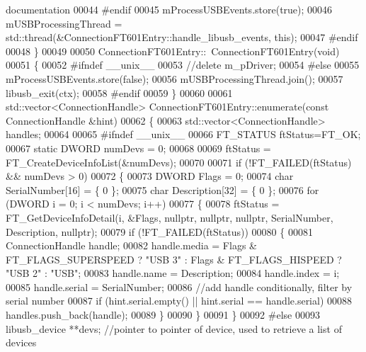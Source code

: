 \begin{DoxyCode}
{{{       documentation}
00044 \textcolor{preprocessor}{#endif}
00045     mProcessUSBEvents.store(\textcolor{keyword}{true});
00046     mUSBProcessingThread = std::thread(&ConnectionFT601Entry::handle\_libusb\_events, \textcolor{keyword}{this});
00047 \textcolor{preprocessor}{#endif}
00048 \}
00049 
00050 ConnectionFT601Entry::~ConnectionFT601Entry(\textcolor{keywordtype}{void})
00051 \{
00052 \textcolor{preprocessor}{#ifndef \_\_unix\_\_}
00053     \textcolor{comment}{//delete m\_pDriver;}
00054 \textcolor{preprocessor}{#else}
00055     mProcessUSBEvents.store(\textcolor{keyword}{false});
00056     mUSBProcessingThread.join();
00057     libusb\_exit(ctx);
00058 \textcolor{preprocessor}{#endif}
00059 \}
00060 
00061 std::vector<ConnectionHandle> ConnectionFT601Entry::enumerate(\textcolor{keyword}{const} 
      ConnectionHandle &hint)
00062 \{
00063     std::vector<ConnectionHandle> handles;
00064 
00065 \textcolor{preprocessor}{#ifndef \_\_unix\_\_}
00066     FT_STATUS ftStatus=FT_OK;
00067     \textcolor{keyword}{static} DWORD numDevs = 0;
00068 
00069     ftStatus = FT\_CreateDeviceInfoList(&numDevs);
00070 
00071     \textcolor{keywordflow}{if} (!FT_FAILED(ftStatus) && numDevs > 0)
00072     \{
00073         DWORD Flags = 0;
00074         \textcolor{keywordtype}{char} SerialNumber[16] = \{ 0 \};
00075         \textcolor{keywordtype}{char} Description[32] = \{ 0 \};
00076         \textcolor{keywordflow}{for} (DWORD i = 0; i < numDevs; i++)
00077         \{
00078             ftStatus = FT\_GetDeviceInfoDetail(i, &Flags, \textcolor{keyword}{nullptr}, \textcolor{keyword}{nullptr}, \textcolor{keyword}{nullptr}, SerialNumber, 
      Description, \textcolor{keyword}{nullptr});
00079             \textcolor{keywordflow}{if} (!FT_FAILED(ftStatus))
00080             \{
00081                 ConnectionHandle handle;
00082                 handle.media = Flags & FT_FLAGS_SUPERSPEED ? \textcolor{stringliteral}{"USB 3"} : Flags & 
      FT_FLAGS_HISPEED ? \textcolor{stringliteral}{"USB 2"} : \textcolor{stringliteral}{"USB"};
00083                 handle.name = Description;
00084                 handle.index = i;
00085                 handle.serial = SerialNumber;
00086                 \textcolor{comment}{//add handle conditionally, filter by serial number}
00087                 \textcolor{keywordflow}{if} (hint.serial.empty() || hint.serial == handle.serial)
00088                     handles.push\_back(handle);
00089             \}
00090         \}
00091     \}
00092 \textcolor{preprocessor}{#else}
00093     libusb\_device **devs; \textcolor{comment}{//pointer to pointer of device, used to retrieve a list of devices}
}}
\end{DoxyCode}
